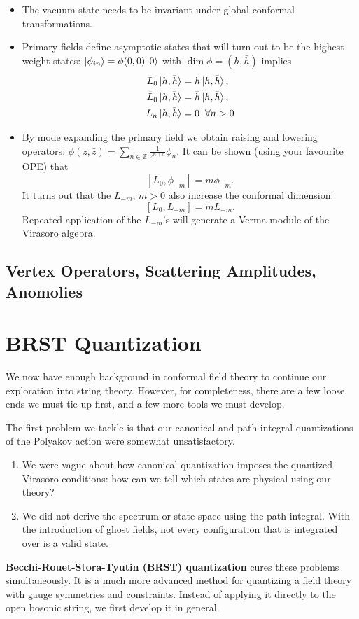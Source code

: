 \documentclass{report}
\theoremstyle{plain}
\theoremstyle{definition}
\theoremstyle{remark}
\newcommand{\FR}[2]{\frac{#1}{#2}}
\newcommand{\bZ}{\mathbb{Z}}
\begin{document}
\begin{itemize}
    \item The vacuum state needs to be invariant under global conformal
        transformations.  
    \item Primary fields define asymptotic states that will turn out to be
        the highest weight states: $\ket{\phi_{in}} = \phi(0,0)\ket 0$ with
        $\dim \phi = (h,\bar h)$ implies 
        \begin{align*}
            L_0\ket{h,\bar h} &= h \ket{h,\bar h},\\
            \bar L_0\ket{h,\bar h} &= \bar h \ket{h,\bar h},\\ 
            L_n\ket{h,\bar h} &= 0\;\;\forall n>0
        \end{align*}
    \item By mode expanding the primary field we obtain raising and
        lowering operators: $\phi(z,\bar z) = \sum_{n\in\bZ}
        \FR{1}{z^{n+h}} \phi_n$. It can be shown (using your favourite OPE)
        that \[ [L_0,\phi_{-m}] = m\phi_{-m}.\] It turns out that the
        $L_{-m}$, $m>0$ also increase the conformal dimension:
        \[ [L_0,L_{-m}]=mL_{-m}.\]
        Repeated application of the $L_{-m}$'s will generate a Verma module
        of the Virasoro algebra.
\end{itemize}


\section{Vertex Operators, Scattering Amplitudes, Anomolies}

\chapter{BRST Quantization}

We now have enough background in conformal field theory to continue
our exploration into string theory. However, for completeness, there
are a few loose ends we must tie up first, and a few more tools we
must develop.

The first problem we tackle is that our canonical and path integral
quantizations of the Polyakov action were somewhat unsatisfactory.
\begin{enumerate}
\item We were vague about how canonical quantization imposes the
  quantized Virasoro conditions: how can we tell which states are
  physical using our theory?
\item We did not derive the spectrum or state space using the path
  integral. With the introduction of ghost fields, not every
  configuration that is integrated over is a valid state.
\end{enumerate}
{\bf Becchi-Rouet-Stora-Tyutin (BRST) quantization} cures these
problems simultaneously. It is a much more advanced method for
quantizing a field theory with gauge symmetries and constraints.
Instead of applying it directly to the open bosonic string, we first
develop it in general.
\end{document}
